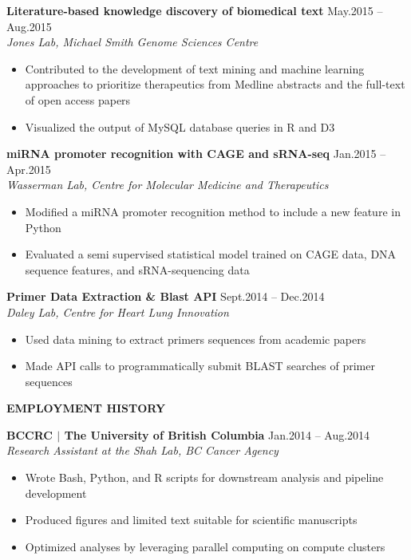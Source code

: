 \documentclass{res}
\renewcommand{\section}[1]{%
  \vspace{0.3in}%
  \centerline{\uppercase{\bf{#1}}}%
  \vspace{-6pt}}
\newcommand{\linehead}[2]{%
  {\bf #1} \hfill #2\\}
\newcommand{\linetitle}[1]{%
  {\sl #1}}
\begin{document}
\begin{resume}
\linehead{Literature-based knowledge discovery of biomedical text}{May.2015 -- Aug.2015}
\linetitle{Jones Lab, Michael Smith Genome Sciences Centre}
\begin{itemize}
  \item Contributed to the development of text mining and machine learning approaches to prioritize therapeutics from Medline abstracts and the full-text of open access papers
  \item Visualized the output of MySQL database queries in R and D3
\end{itemize}

\linehead{miRNA promoter recognition with CAGE and sRNA-seq}{Jan.2015 -- Apr.2015}
\linetitle{Wasserman Lab, Centre for Molecular Medicine and Therapeutics}
\begin{itemize}
  \item Modified a miRNA promoter recognition method to include a new feature in Python
  \item Evaluated a semi supervised statistical model trained on CAGE data, DNA sequence features, and sRNA-sequencing data
\end{itemize}

\linehead{Primer Data Extraction \& Blast API}{Sept.2014 -- Dec.2014}
\linetitle{Daley Lab, Centre for Heart Lung Innovation}
\begin{itemize}
  \item Used data mining to extract primers sequences from academic papers
  \item Made API calls to programmatically submit BLAST searches of primer sequences
\end{itemize}

\section{Employment history}

\linehead{BCCRC $|$ The University of British Columbia}{Jan.2014 -- Aug.2014}
\linetitle{Research Assistant at the Shah Lab, BC Cancer Agency}
\begin{itemize}
  \item Wrote Bash, Python, and R scripts for downstream analysis and pipeline development
  \item Produced figures and limited text suitable for scientific manuscripts
  \item Optimized analyses by leveraging parallel computing on compute clusters
\end{itemize}


\end{resume}
\end{document}

